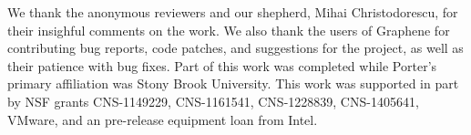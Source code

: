 \begin{edits}

We thank the anonymous reviewers and our shepherd, Mihai Christodorescu,
 for their insighful comments
on the work.
We also thank the users of Graphene for contributing bug reports, code patches, and suggestions for the project,
as well as their patience with bug fixes.
Part of this work was completed while Porter's primary affiliation was Stony Brook University.
This work was supported in part by NSF grants
CNS-1149229, CNS-1161541, CNS-1228839, CNS-1405641, VMware, and an \sgx{} pre-release equipment loan from Intel.
\end{edits}

